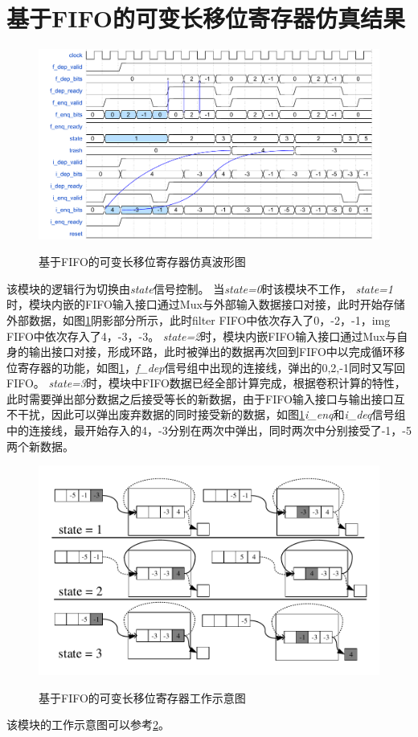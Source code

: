 \section{基于FIFO的可变长移位寄存器仿真结果}
\begin{figure}[h]
    \centering
    \includegraphics[scale=0.7]{../pdf/shift_w.pdf}\\
    \caption{基于FIFO的可变长移位寄存器仿真波形图}
    \label{shift_w}
\end{figure}
该模块的逻辑行为切换由\emph{state}信号控制。
当\emph{state=0}时该模块不工作，
\emph{state=1}时，模块内嵌的FIFO输入接口通过Mux与外部输入数据接口对接，此时开始存储外部数据，如图\ref{shift_w}阴影部分所示，此时filter FIFO中依次存入了0，-2，-1，img FIFO中依次存入了4，-3，-3。
\emph{state=2}时，模块内嵌FIFO输入接口通过Mux与自身的输出接口对接，形成环路，此时被弹出的数据再次回到FIFO中以完成循环移位寄存器的功能，如图\ref{shift_w}，\emph{f\_dep}信号组中出现的连接线，弹出的0,2,-1同时又写回FIFO。
\emph{state=3}时，模块中FIFO数据已经全部计算完成，根据卷积计算的特性，此时需要弹出部分数据之后接受等长的新数据，由于FIFO输入接口与输出接口互不干扰，因此可以弹出废弃数据的同时接受新的数据，如图\ref{shift_w}\emph{i\_enq}和\emph{i\_deq}信号组中的连接线，最开始存入的4，-3分别在两次中弹出，同时两次中分别接受了-1，-5两个新数据。
\begin{figure}[h]
    \centering
    \includegraphics[scale=0.8]{../pdf/shift_k.pdf}\\
    \caption{基于FIFO的可变长移位寄存器工作示意图}
    \label{shift_k}
\end{figure}
该模块的工作示意图可以参考\ref{shift_k}。

